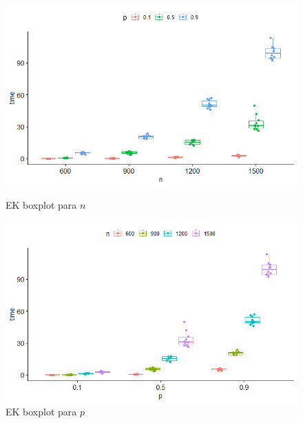 \documentclass{uofa-eng-assignment}
\begin{document}
\begin{figure}[h]
    \begin{minipage}{0.45\textwidth}
        \centering
        \includegraphics[width=.7\textwidth]{ek_plot1.png}
        \caption{EK boxplot para $n$}
        \label{fig:boxplot-ek-n}
    \end{minipage}
    \hfill
    \begin{minipage}{0.45\textwidth}
        \centering
        \includegraphics[width=.7\textwidth]{ek_plot2.png}
        \caption{EK boxplot para $p$}
        \label{fig:boxplot-ek-p}
    \end{minipage}
\end{figure}
\end{document}
